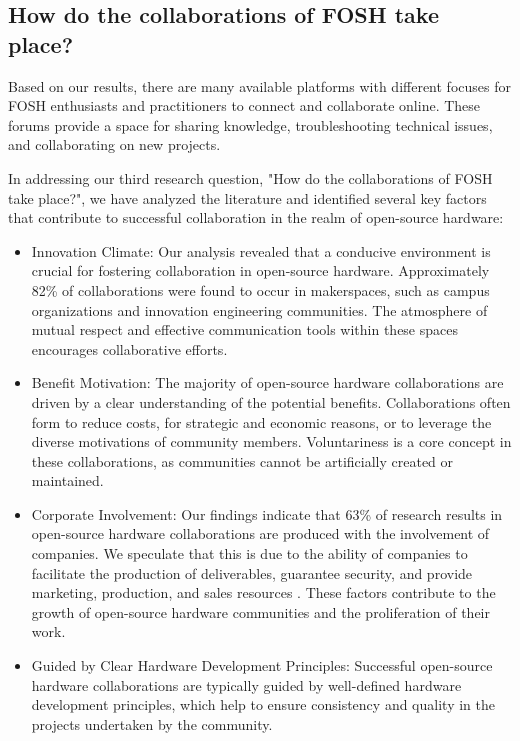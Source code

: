 \documentclass[final-report.tex]{subfiles}
\begin{document}
\subsection{How do the collaborations of FOSH take place?}
Based on our results, there are many available platforms with different focuses for FOSH enthusiasts and practitioners to connect and collaborate online. These forums provide a space for sharing knowledge, troubleshooting technical issues, and collaborating on new projects.

In addressing our third research question, "How do the collaborations of FOSH take place?", we have analyzed the literature and identified several key factors that contribute to successful collaboration in the realm of open-source hardware:
\begin{itemize}
    \item Innovation Climate: Our analysis revealed that a conducive environment is crucial for fostering collaboration in open-source hardware. Approximately 82\% of collaborations were found to occur in makerspaces, such as campus organizations and innovation engineering communities. The atmosphere of mutual respect and effective communication tools within these spaces encourages collaborative efforts.
    \item Benefit Motivation: The majority of open-source hardware collaborations are driven by a clear understanding of the potential benefits. Collaborations often form to reduce costs, for strategic and economic reasons, or to leverage the diverse motivations of community members. Voluntariness is a core concept in these collaborations, as communities cannot be artificially created or maintained.
    \item Corporate Involvement: Our findings indicate that 63\% of research results in open-source hardware collaborations are produced with the involvement of companies. We speculate that this is due to the ability of companies to facilitate the production of deliverables, guarantee security, and provide marketing, production, and sales resources \cite{peters2022success}. These factors contribute to the growth of open-source hardware communities and the proliferation of their work.
    \item Guided by Clear Hardware Development Principles: Successful open-source hardware collaborations are typically guided by well-defined hardware development principles, which help to ensure consistency and quality in the projects undertaken by the community.
\end{itemize}
\end{document}

